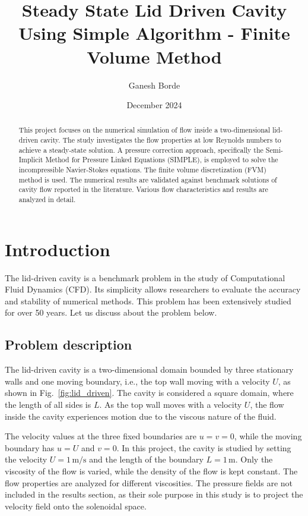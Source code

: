\documentclass{article}
\title{ Steady State Lid Driven Cavity Using Simple Algorithm - Finite Volume Method}
\author{Ganesh Borde}
\date{December 2024}
\numberwithin{equation}{section}
\numberwithin{figure}{section}
\begin{document}
\maketitle
\begin{abstract}
    This project focuses on the numerical simulation of flow inside a two-dimensional lid-driven 
    cavity. The study investigates the flow properties at low Reynolds numbers to 
    achieve a steady-state solution. A pressure correction approach, specifically the 
    Semi-Implicit Method for Pressure Linked Equations (SIMPLE), is employed to solve 
    the incompressible Navier-Stokes equations. The finite volume  discretization (FVM) 
    method is used. The numerical results are validated against benchmark solutions of 
    cavity flow reported in the literature. Various flow characteristics and results 
    are analyzed in detail.
\end{abstract}
\section{Introduction}
The lid-driven cavity is a benchmark problem in the study of Computational 
Fluid Dynamics (CFD). Its simplicity allows researchers to evaluate the accuracy and 
stability of numerical methods. This problem has been extensively studied for over 50 years. Let 
us discuss about the problem below.

\subsection{Problem description}
The lid-driven cavity is a two-dimensional domain bounded by three stationary walls and one 
moving boundary, i.e., the top wall moving with a velocity \( U \), as shown in Fig.~\ref{fig:lid_driven}. The 
cavity is considered a square domain, where the length of all sides is \( L \). As the 
top wall moves with a velocity \( U \), the flow inside the cavity experiences motion 
due to the viscous nature of the fluid. 

The velocity values at the three fixed boundaries are \( u = v = 0 \), while the 
moving boundary has \( u = U \) and \( v = 0 \). In this project, the cavity is 
studied by setting the velocity \( U = 1 \, \mathrm{m/s} \) and the length of 
the boundary \( L = 1 \, \mathrm{m} \). Only the viscosity of the flow is 
varied, while the density of the flow is kept constant. The flow properties are analyzed 
for different viscosities. The pressure fields are not included in the results section, as 
their sole purpose in this study is to project the velocity field onto the solenoidal space.
\end{document}
